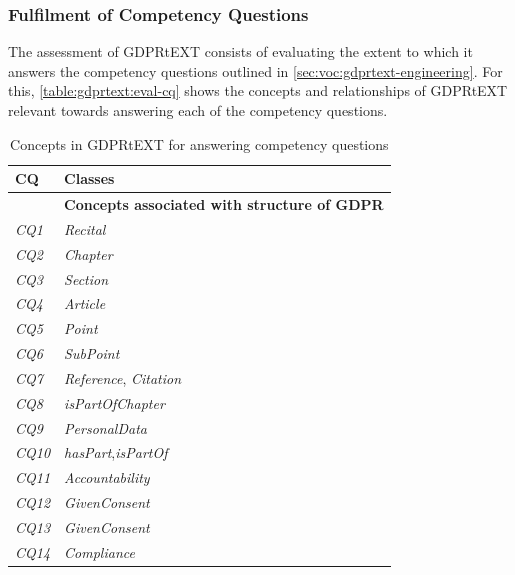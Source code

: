 \subsubsection{Fulfilment of Competency Questions}
The assessment of GDPRtEXT consists of evaluating the extent to which it answers the competency questions outlined in \autoref{sec:voc:gdprtext-engineering}.
For this, \autoref{table:gdprtext:eval-cq} shows the concepts and relationships of GDPRtEXT relevant towards answering each of the competency questions.
\begin{table}[htbp]
\footnotesize
\centering
\caption{Concepts in GDPRtEXT for answering competency questions}
\begin{tabularx}{\textwidth}{|l|X|}
\hline
\textbf{CQ} & \textbf{Classes} \\ \hline
& \textbf{Concepts associated with structure of GDPR} \\ \hline
\textit{CQ1} & \textit{Recital} \\ \hline
\textit{CQ2} & \textit{Chapter} \\ \hline
\textit{CQ3} & \textit{Section} \\ \hline
\textit{CQ4} & \textit{Article} \\ \hline
\textit{CQ5} & \textit{Point} \\ \hline
\textit{CQ6} & \textit{SubPoint} \\ \hline
\textit{CQ7} & \textit{Reference}, \textit{Citation} \\ \hline
\textit{CQ8} & \textit{isPartOfChapter} \\ \hline
\textit{CQ9} & \textit{PersonalData} \\ \hline
\textit{CQ10} & \textit{hasPart},\textit{isPartOf} \\ \hline
\textit{CQ11} & \textit{Accountability} \\ \hline
\textit{CQ12} & \textit{GivenConsent} \\ \hline
\textit{CQ13} & \textit{GivenConsent} \\ \hline
\textit{CQ14} & \textit{Compliance} \\ \hline


\end{tabularx}
\end{table}
